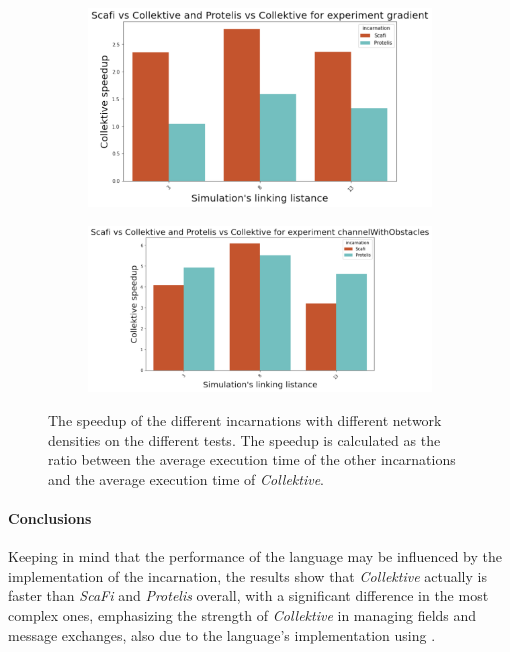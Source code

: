 \begin{figure}[ht!]
\begin{subfigure}[b]{0.49\textwidth}
    \end{subfigure}
    \begin{subfigure}[b]{0.49\textwidth}
        \centering
        \includegraphics[width=\textwidth]{figures/gradient-speedup}
    \end{subfigure}
    \begin{subfigure}[b]{0.49\textwidth}
        \centering
        \includegraphics[width=\textwidth]{figures/channel-speedup}
    \end{subfigure}
    \caption{The speedup of the different incarnations with different network densities on the different tests.
        The speedup is calculated as the ratio between the average execution time of the other incarnations and the average
        execution time of \emph{Collektive}.}
    \label{fig:speedup}
\end{figure}

\paragraph{Conclusions}
Keeping in mind that the performance of the language may be influenced by the implementation of the incarnation, the results
show that \emph{Collektive} actually is faster than \emph{ScaFi} and \emph{Protelis} overall, with a significant
difference in the most complex ones, emphasizing the strength of \emph{Collektive} in managing fields and message exchanges,
also due to the language's implementation using \xc{}.

